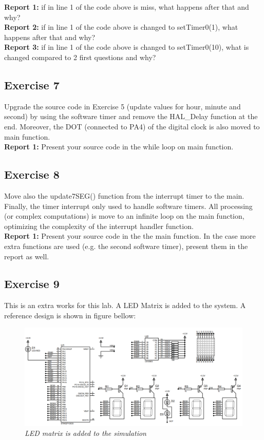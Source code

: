 \textbf{Report 1: } if in line 1 of the code above is miss, what happens after that and why?\\


\textbf{Report 2: } if in line 1 of the code above is changed to setTimer0(1), what happens after that and why?\\

\textbf{Report 3: } if in line 1 of the code above is changed to setTimer0(10), what is changed compared to 2 first questions and why?\\

\subsection{Exercise 7}
Upgrade the source code in Exercise 5 (update values for hour, minute and second) by using the software timer and remove the HAL\_Delay function at the end. Moreover, the DOT (connected to PA4) of the digital clock is also moved to main function. \\

\textbf{Report 1: } Present your source code in the while loop on main function.

\subsection{Exercise 8}
Move also the update7SEG() function from the interrupt  timer to the main. Finally, the timer interrupt only used to handle  software timers. All processing (or complex computations) is move to an infinite loop on the main function, optimizing the complexity of the interrupt  handler function.\\

\textbf{Report 1: } Present your source code in the the main function. In the case more extra functions are used (e.g. the second software timer), present them in the report as well.

\subsection{Exercise 9}

This is an extra works for this lab. A LED Matrix is added to the system. A reference design is shown in figure bellow:
\begin{figure}[!htp]
    \centering
    \includegraphics[width=5.5in]{source/picture/bai_2/lab2_m4.PNG}
    \caption{\textit{LED matrix is added to the simulation}}
    \label{bai2_pic9}
\end{figure}

